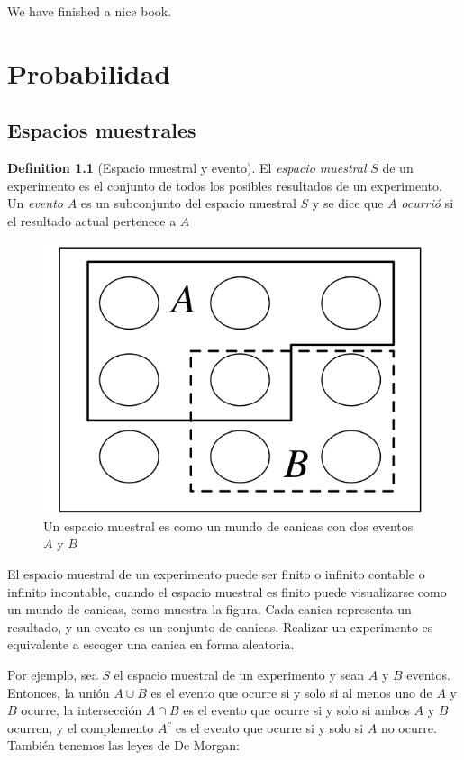 \documentclass[
]{book}
\theoremstyle{definition}
\newtheorem{definition}{Definition}[chapter]
\theoremstyle{definition}
\theoremstyle{definition}
\theoremstyle{definition}
\theoremstyle{remark}
\begin{document}
We have finished a nice book.

\hypertarget{probabilidad}{%
\chapter{Probabilidad}\label{probabilidad}}

\hypertarget{espacios-muestrales}{%
\section{Espacios muestrales}\label{espacios-muestrales}}

\begin{definition}[Espacio muestral y evento]
\protect\hypertarget{def:muestral}{}\label{def:muestral}El \emph{espacio muestral} \(S\) de un experimento es el conjunto de todos los posibles resultados de un experimento. Un \emph{evento} \(A\) es un subconjunto del espacio muestral \(S\) y se dice que \(A\) \emph{ocurrió} si el resultado actual pertenece a \(A\)
\end{definition}

\citep{blitzstein2019}

\begin{figure}

{\centering \includegraphics[width=0.3\linewidth]{./images/pebbles} 

}

\caption{Un espacio muestral es como  un mundo de canicas con dos eventos $A$ y $B$}\label{fig:unnamed-chunk-3}
\end{figure}

El espacio muestral de un experimento puede ser finito o infinito contable o infinito incontable, cuando el espacio muestral es finito puede visualizarse como un mundo de canicas, como muestra la figura. Cada canica representa un resultado, y un evento es un conjunto de canicas. Realizar un experimento es equivalente a escoger una canica en forma aleatoria.

Por ejemplo, sea \(S\) el espacio muestral de un experimento y sean \(A\) y \(B\) eventos. Entonces, la unión \(A \cup B\) es el evento que ocurre si y solo si al menos uno de \(A\) y \(B\) ocurre, la intersección \(A \cap B\) es el evento que ocurre si y solo si ambos \(A\) y \(B\) ocurren, y el complemento \(A^c\) es el evento que ocurre si y solo si \(A\) no ocurre. También tenemos las leyes de De Morgan:
\end{document}
